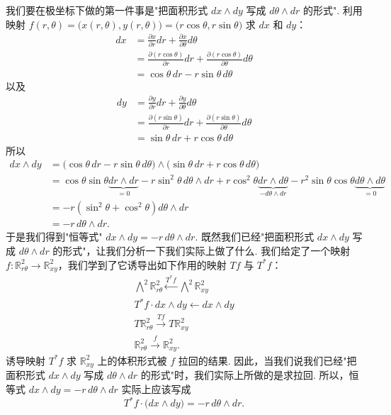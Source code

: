 我们要在极坐标下做的第一件事是"把面积形式 $dx\wedge dy$ 写成 $d\theta\wedge dr$ 的形式". 利用映射 $f(r,\theta)=\bigl(x(r,\theta),y(r,\theta)\bigr)=\bigl(r\cos\theta,r\sin\theta\bigr)$ 求 $dx$ 和 $dy$：
\begin{align*}
dx&=\frac{\partial x}{\partial r}dr+\frac{\partial x}{\partial\theta}d\theta\\
&=\frac{\partial(r\cos\theta)}{\partial r}dr+\frac{\partial(r\cos\theta)}{\partial\theta}d\theta\\
&=\cos\theta\,dr-r\sin\theta\,d\theta
\end{align*}
以及
\begin{align*}
dy&=\frac{\partial y}{\partial r}dr+\frac{\partial y}{\partial\theta}d\theta\\
&=\frac{\partial(r\sin\theta)}{\partial r}dr+\frac{\partial(r\sin\theta)}{\partial\theta}d\theta\\
&=\sin\theta\,dr+r\cos\theta\,d\theta
\end{align*}
所以
\begin{align*}
dx\wedge dy&=\bigl(\cos\theta\,dr-r\sin\theta\,d\theta\bigr)\wedge\bigl(\sin\theta\,dr+r\cos\theta\,d\theta\bigr)\\
&=\cos\theta\sin\theta\underbrace{dr\wedge dr}_{=0}-r\sin^2\theta\,d\theta\wedge dr
+r\cos^2\theta\underbrace{dr\wedge d\theta}_{-d\theta\wedge dr}-r^2\sin\theta\cos\theta\underbrace{d\theta\wedge d\theta}_{=0}\\
&=-r(\sin^2\theta+\cos^2\theta)d\theta\wedge dr\\
&=-r\,d\theta\wedge dr.
\end{align*}
于是我们得到"恒等式" $dx\wedge dy=-r\,d\theta\wedge dr$. 既然我们已经"把面积形式 $dx\wedge dy$ 写成 $d\theta\wedge dr$ 的形式"，让我们分析一下我们实际上做了什么. 我们给定了一个映射 $f:\mathbb{R}^2_{r\theta}\to\mathbb{R}^2_{xy}$，我们学到了它诱导出如下作用的映射 $Tf$ 与 $T^*f$：
\[
\begin{gathered}
\bigwedge^2\mathbb{R}^2_{r\theta}\xleftarrow{T^*f}\bigwedge^2\mathbb{R}^2_{xy}\\
T^*f\cdot dx\wedge dy\longleftarrow dx\wedge dy\\
T\mathbb{R}^2_{r\theta}\xrightarrow{Tf}T\mathbb{R}^2_{xy}\\
\mathbb{R}^2_{r\theta}\xrightarrow{f}\mathbb{R}^2_{xy}.
\end{gathered}
\]
诱导映射 $T^*f$ 求 $\mathbb{R}^2_{xy}$ 上的体积形式被 $f$ 拉回的结果. 因此，当我们说我们已经"把面积形式 $dx\wedge dy$ 写成 $d\theta\wedge dr$ 的形式"时，我们实际上所做的是求拉回. 所以，恒等式 $dx\wedge dy=-r\,d\theta\wedge dr$ 实际上应该写成
\[
T^*f\cdot\bigl(dx\wedge dy\bigr)=-r\,d\theta\wedge dr.
\]

